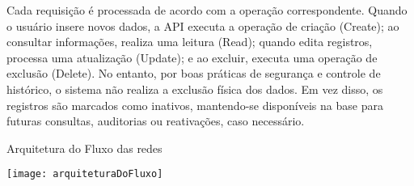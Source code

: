 Cada requisição é processada de acordo com a operação correspondente. Quando o usuário insere novos dados, a API executa a operação de criação (Create); ao consultar informações, realiza uma leitura (Read); quando edita registros, processa uma atualização (Update); e ao excluir, executa uma operação de exclusão (Delete). No entanto, por boas práticas de segurança e controle de histórico, o sistema não realiza a exclusão física dos dados. Em vez disso, os registros são marcados como inativos, mantendo-se disponíveis na base para futuras consultas, auditorias ou reativações, caso necessário.

\begin{flowchart}[!htb]
\centering
\caption{Arquitetura do Fluxo das redes}%
\label{fcht:ex-algorithm}
\texttt{[image: arquiteturaDoFluxo]}
\end{flowchart}